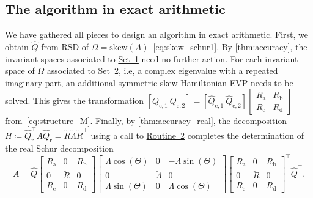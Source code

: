 \documentclass[10pt,twoside,dvipsnames]{siamart1116}
\numberwithin{algorithm}{section}
\numberwithin{equation}{section}
\newcommand{\wordref}[2]{\hyperlink{#1}{#2}}
\newcommand{\new}[1]{#1}
\begin{document}
	\subsection{The algorithm in exact arithmetic} \new{We have gathered all pieces to design an algorithm in exact arithmetic. First, we obtain $\widehat{Q}$ from RSD of $\Omega=\mathrm{skew}(A)$~\eqref{eq:skew_schur1}. By \cref{thm:accuracy}, the invariant spaces associated to \wordref{set1}{Set~1} need no further action. For each invariant space of $\Omega$ associated to \wordref{set2}{Set~2}, i.e, a complex eigenvalue with a repeated imaginary part, an additional symmetric skew-Hamiltonian EVP needs to be solved. This gives the transformation $[Q_{\mathrm{c},1}\ Q_{\mathrm{c},2}] =[\widehat{Q}_{\mathrm{c},1}\ \widehat{Q}_{\mathrm{c},2}]\left[\begin{smallmatrix}R_{\mathrm{a}}&R_{\mathrm{b}}\\R_{\mathrm{c}}&R_{\mathrm{d}}\end{smallmatrix}\right]$ from~\eqref{eq:structure_M}.} Finally, by \cref{thm:accuracy_real}, the decomposition $H\coloneq\widehat{Q}_{\mathrm{r}}^\top A\widehat{Q}_{\mathrm{r}} =\breve{R}\breve{\Lambda}\breve{R}^\top $ using a call to \wordref{oracle2}{Routine~2} completes the determination of the real Schur decomposition 
	\begin{equation*}
	A = \widehat{Q}\begin{bmatrix}
	R_{\mathrm{a}}&0&R_{\mathrm{b}}\\
	0&\breve{R}&0\\
	R_{\mathrm{c}}&0&R_{\mathrm{d}}
\end{bmatrix} \begin{bmatrix}
	\Lambda\cos(\Theta)&0&-\Lambda\sin(\Theta)\\
	0&\breve{\Lambda}&0\\
	 \Lambda\sin(\Theta)&0&\Lambda\cos(\Theta)
	\end{bmatrix}\begin{bmatrix}
	R_{\mathrm{a}}&0&R_{\mathrm{b}}\\
	0&\breve{R}&0\\
	R_{\mathrm{c}}&0&R_{\mathrm{d}}
\end{bmatrix}^\top  \widehat{Q}^\top .
	\end{equation*}
\end{document}
